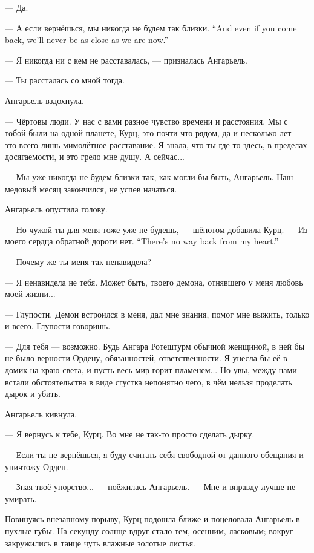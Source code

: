 --- Да.

{--- А если вернёшься, мы никогда не будем так близки.}
{``And even if you come back, we'll never be as close as we are now.''}

--- Я никогда ни с кем не расставалась, --- призналась Ангарьель.

--- Ты рассталась со мной тогда.

Ангарьель вздохнула.

--- Чёртовы люди.
У нас с вами разное чувство времени и расстояния.
Мы с тобой были на одной планете, Курц, это почти что рядом, да и несколько лет --- это всего лишь мимолётное расставание.
Я знала, что ты где-то здесь, в пределах досягаемости, и это грело мне душу.
А сейчас...

--- Мы уже никогда не будем близки так, как могли бы быть, Ангарьель.
Наш медовый месяц закончился, не успев начаться.

Ангарьель опустила голову.

--- Но чужой ты для меня тоже уже не будешь, --- шёпотом добавила Курц.
{--- Из моего сердца обратной дороги нет.}
{``There's no way back from my heart.''}

--- Почему же ты меня так ненавидела?

--- Я ненавидела не тебя.
Может быть, твоего демона, отнявшего у меня любовь моей жизни...

--- Глупости.
Демон встроился в меня, дал мне знания, помог мне выжить, только и всего.
Глупости говоришь.

--- Для тебя --- возможно.
Будь Ангара Ротештурм обычной женщиной, в ней бы не было верности Ордену, обязанностей, ответственности.
Я унесла бы её в домик на краю света, и пусть весь мир горит пламенем...
Но увы, между нами встали обстоятельства в виде сгустка непонятно чего, в чём нельзя проделать дырок и убить.

Ангарьель кивнула.

--- Я вернусь к тебе, Курц.
Во мне не так-то просто сделать дырку.

--- Если ты не вернёшься, я буду считать себя свободной от данного обещания и уничтожу Орден.

--- Зная твоё упорство... --- поёжилась Ангарьель.
--- Мне и вправду лучше не умирать.

Повинуясь внезапному порыву, Курц подошла ближе и поцеловала Ангарьель в пухлые губы.
На секунду солнце вдруг стало тем, осенним, ласковым;
вокруг закружились в танце чуть влажные золотые листья.

